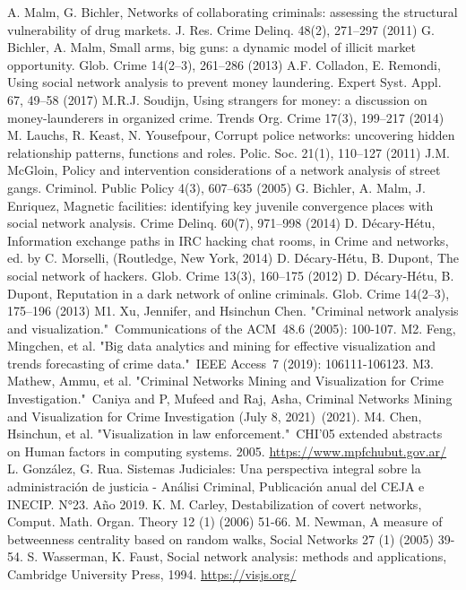 \documentclass[runningheads]{llncs}
\begin{document}
\begin{thebibliography}{8}
	A. Malm, G. Bichler, Networks of collaborating criminals: assessing the structural vulnerability of drug markets. J. Res. Crime Delinq. 48(2), 271–297 (2011)
	G. Bichler, A. Malm, Small arms, big guns: a dynamic model of illicit market opportunity. Glob. Crime 14(2–3), 261–286 (2013)
	A.F. Colladon, E. Remondi, Using social network analysis to prevent money laundering. Expert Syst. Appl. 67, 49–58 (2017)
	M.R.J. Soudijn, Using strangers for money: a discussion on money-launderers in organized crime. Trends Org. Crime 17(3), 199–217 (2014)
	M. Lauchs, R. Keast, N. Yousefpour, Corrupt police networks: uncovering hidden relationship patterns, functions and roles. Polic. Soc. 21(1), 110–127 (2011)
	J.M. McGloin, Policy and intervention considerations of a network analysis of street gangs. Criminol. Public Policy 4(3), 607–635 (2005)
	G. Bichler, A. Malm, J. Enriquez, Magnetic facilities: identifying key juvenile convergence places with social network analysis. Crime Delinq. 60(7), 971–998 (2014)
	D. Décary-Hétu, Information exchange paths in IRC hacking chat rooms, in Crime and networks, ed. by C. Morselli, (Routledge, New York, 2014)
	D. Décary-Hétu, B. Dupont, The social network of hackers. Glob. Crime 13(3), 160–175 (2012)
	D. Décary-Hétu, B. Dupont, Reputation in a dark network of online criminals. Glob. Crime 14(2–3), 175–196 (2013)
	M1. Xu, Jennifer, and Hsinchun Chen. "Criminal network analysis and visualization." Communications of the ACM 48.6 (2005): 100-107.
	M2. Feng, Mingchen, et al. "Big data analytics and mining for effective visualization and trends forecasting of crime data." IEEE Access 7 (2019): 106111-106123.
	M3. Mathew, Ammu, et al. "Criminal Networks Mining and Visualization for Crime Investigation." Caniya and P, Mufeed and Raj, Asha, Criminal Networks Mining and Visualization for Crime Investigation (July 8, 2021) (2021).
	M4. Chen, Hsinchun, et al. "Visualization in law enforcement." CHI'05 extended abstracts on Human factors in computing systems. 2005.
	\url{https://www.mpfchubut.gov.ar/}
	L. González, G. Rua. Sistemas Judiciales: Una perspectiva integral sobre la administración de justicia - Análisi Criminal, Publicación anual del CEJA e INECIP. N°23. Año 2019.
	K. M. Carley, Destabilization of covert networks, Comput. Math. Organ. Theory 12 (1) (2006) 51-66.
	M. Newman, A measure of betweenness centrality based on random walks, Social Networks 27 (1) (2005) 39-54.
	S. Wasserman, K. Faust, Social network analysis: methods and applications, Cambridge University Press, 1994.
	\url{https://visjs.org/}
\end{thebibliography}
\end{document}
